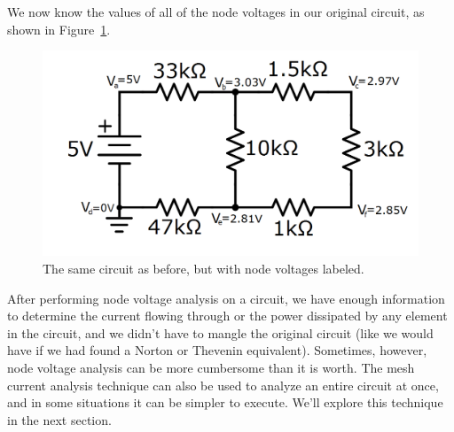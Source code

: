 We now know the values of all of the node voltages in our original circuit, as shown in Figure~\ref{nodeVCircuit_VsLabeled}.
\begin{figure}[h!]
\centering
\includegraphics[width=4.65in]{figures/nodeVoltageExCircuit_nodeVnumbers.png}
\caption{The same circuit as before, but with node voltages labeled.}
\label{nodeVCircuit_VsLabeled}
\end{figure}
\par
After performing node voltage analysis on a circuit, we have enough information to determine the current flowing through or the power dissipated by any element in the circuit, and we didn't have to mangle the original circuit (like we would have if we had found a Norton or Thevenin equivalent). Sometimes, however, node voltage analysis can be more cumbersome than it is worth. The mesh current analysis technique can also be used to analyze an entire circuit at once, and in some situations it can be simpler to execute. We'll explore this technique in the next section.
